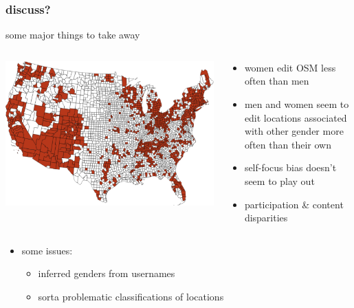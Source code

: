 \documentclass[presentation]{subfiles}
\begin{document}
\begin{frame}\frametitle{discuss?}
  \begin{center}
  some major things to take away
  \end{center}
  
  \begin{columns}
  \begin{column}{0.4\textwidth}
  \includegraphics[width=\textwidth]{figures/disparity_alpha.png}
  \end{column}
  
  \begin{column}{0.59\textwidth}
  \begin{itemize}
    \item women edit OSM less often than men
    \item men and women seem to edit locations associated with other gender more often than their own
    \item self-focus bias doesn't \alert{seem} to play out
    \item participation \& content disparities
  \end{itemize}
  \end{column}
  \end{columns}

\begin{itemize}
\item some issues:
    \begin{itemize}
      \item inferred genders from usernames
      \item sorta problematic classifications of locations
    \end{itemize}
\end{itemize}

\end{frame}
\end{document}

